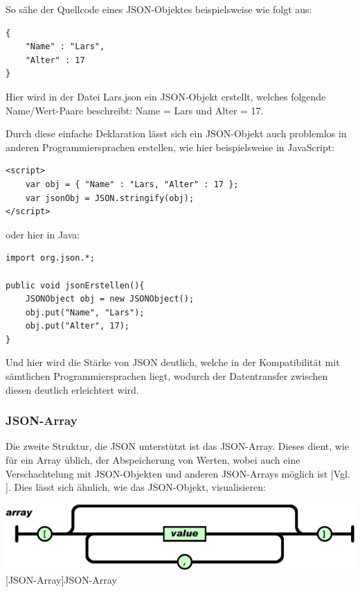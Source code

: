 \documentclass[12pt,a4paper,bibliography=totocnumbered,listof=totocnumbered]{scrartcl}
\begin{document}
So sähe der Quellcode eines JSON-Objektes beispielsweise wie folgt aus:
\\
\vspace{1em}
\begin{lstlisting}[caption=Lars.json, label=lst:json-objekt]
{
	"Name" : "Lars",
	"Alter" : 17
}
\end{lstlisting}
Hier wird in der Datei \glqq Lars.json\grqq{} ein JSON-Objekt erstellt, welches folgende Name/Wert-Paare beschreibt:
Name = Lars und Alter = 17.

Durch diese einfache Deklaration lässt sich ein JSON-Objekt auch problemlos in anderen Programmiersprachen erstellen, wie hier beispielsweise in JavaScript:
\\
\vspace{1em}
\begin{lstlisting}[caption=JSON-Objekt in JavaScript, label=lst:json-objekt1]
<script>
	var obj = { "Name" : "Lars, "Alter" : 17 };
	var jsonObj = JSON.stringify(obj);
</script>
\end{lstlisting}

oder hier in Java:
\\
\vspace{1em}
\begin{lstlisting}[caption=JSON-Objekt in Java, label=lst:json-objekt2]
import org.json.*;

public void jsonErstellen(){
	JSONObject obj = new JSONObject();
	obj.put("Name", "Lars");
	obj.put("Alter", 17);
}
\end{lstlisting}

Und hier wird die Stärke von JSON deutlich, welche in der Kompatibilität mit sämtlichen Programmiersprachen liegt, wodurch der Datentransfer zwischen diesen deutlich erleichtert wird.

\subsubsection{JSON-Array}
\label{sec:JSON-Array}
Die zweite Struktur, die JSON unterstützt ist das JSON-Array.
Dieses dient, wie für ein Array üblich, der Abspeicherung von Werten, wobei auch eine Verschachtelung mit JSON-Objekten und anderen JSON-Arrays möglich ist [Vgl. \cite{json}].
Dies lässt sich ähnlich, wie das JSON-Objekt, visualisieren:

\vspace{1em}
\begin{minipage}{\linewidth}
	\centering
	\includegraphics[width=0.9\linewidth]{Bilder/json-array.png}
	[JSON-Array]{JSON-Array\footnotemark }
	\label{fig:json-array}
\end{minipage}
\end{document}
